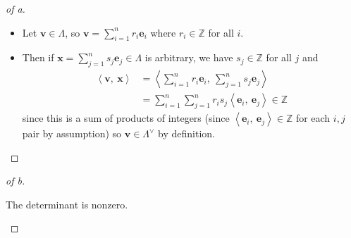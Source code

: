 \begin{solution}

\envlist

\begin{proof}[of a]

\envlist

\begin{itemize}
\item
  Let \(\mathbf{v} \in \Lambda\), so
  \(\mathbf{v} = \sum_{i=1}^n r_i \mathbf{e}_i\) where
  \(r_i \in {\mathbb{Z}}\) for all \(i\).
\item
  Then if \(\mathbf{x} = \sum_{j=1}^n s_j \mathbf{e}_j \in \Lambda\) is
  arbitrary, we have \(s_j \in {\mathbb{Z}}\) for all \(j\) and
  \begin{align*}
  {\left\langle {\mathbf{v}},~{\mathbf{x}} \right\rangle} 
  &= {\left\langle {\sum_{i=1}^n r_i \mathbf{e}_i},~{\sum_{j=1}^n s_j \mathbf{e}_j } \right\rangle} \\
  &= \sum_{i=1}^n \sum_{j=1}^n r_i s_j {\left\langle {\mathbf{e}_i},~{\mathbf{e}_j } \right\rangle}  \in {\mathbb{Z}}
  \end{align*}
  since this is a sum of products of integers (since
  \({\left\langle {\mathbf{e}_i},~{\mathbf{e}_j} \right\rangle} \in {\mathbb{Z}}\)
  for each \(i, j\) pair by assumption) so
  \(\mathbf{v} \in \Lambda^\vee\) by definition.
\end{itemize}

\end{proof}

\begin{proof}[of b]

\begin{claim}

The determinant is nonzero.

\end{claim}


\end{proof}
\end{solution}
